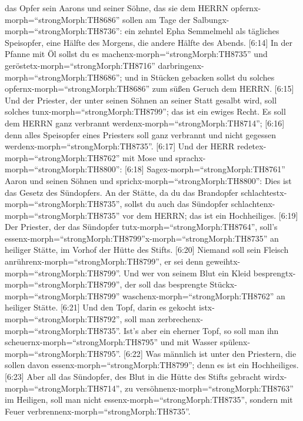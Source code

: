 das Opfer sein Aarons und seiner Söhne, das sie dem HERRN
opfernx-morph=``strongMorph:TH8686'' sollen am Tage der
Salbungx-morph=``strongMorph:TH8736'': ein zehntel Epha Semmelmehl als
tägliches Speisopfer, eine Hälfte des Morgens, die andere Hälfte des
Abends.  {[}6:14{]} In der Pfanne mit Öl sollst du es
machenx-morph=``strongMorph:TH8735'' und
geröstetx-morph=``strongMorph:TH8716''
darbringenx-morph=``strongMorph:TH8686''; und in Stücken gebacken sollst
du solches opfernx-morph=``strongMorph:TH8686'' zum süßen Geruch dem
HERRN.  {[}6:15{]} Und der Priester, der unter seinen
Söhnen an seiner Statt gesalbt wird, soll solches
tunx-morph=``strongMorph:TH8799''; das ist ein ewiges Recht. Es soll dem
HERRN ganz verbrannt werdenx-morph=``strongMorph:TH8714''; 
{[}6:16{]} denn alles Speisopfer eines Priesters soll ganz verbrannt und
nicht gegessen werdenx-morph=``strongMorph:TH8735''. 
{[}6:17{]} Und der HERR redetex-morph=``strongMorph:TH8762'' mit Mose
und sprachx-morph=``strongMorph:TH8800'':  {[}6:18{]}
Sagex-morph=``strongMorph:TH8761'' Aaron und seinen Söhnen und
sprichx-morph=``strongMorph:TH8800'': Dies ist das Gesetz des
Sündopfers. An der Stätte, da du das Brandopfer
schlachtestx-morph=``strongMorph:TH8735'', sollst du auch das Sündopfer
schlachtenx-morph=``strongMorph:TH8735'' vor dem HERRN; das ist ein
Hochheiliges.  {[}6:19{]} Der Priester, der das Sündopfer
tutx-morph=``strongMorph:TH8764'', soll's
essenx-morph=``strongMorph:TH8799''x-morph=``strongMorph:TH8735'' an
heiliger Stätte, im Vorhof der Hütte des Stifts. 
{[}6:20{]} Niemand soll sein Fleisch
anrührenx-morph=``strongMorph:TH8799'', er sei denn
geweihtx-morph=``strongMorph:TH8799''. Und wer von seinem Blut ein Kleid
besprengtx-morph=``strongMorph:TH8799'', der soll das besprengte
Stückx-morph=``strongMorph:TH8799''
waschenx-morph=``strongMorph:TH8762'' an heiliger Stätte. 
{[}6:21{]} Und den Topf, darin es gekocht
istx-morph=``strongMorph:TH8792'', soll man
zerbrechenx-morph=``strongMorph:TH8735''. Ist's aber ein eherner Topf,
so soll man ihn scheuernx-morph=``strongMorph:TH8795'' und mit Wasser
spülenx-morph=``strongMorph:TH8795''.  {[}6:22{]} Was
männlich ist unter den Priestern, die sollen davon
essenx-morph=``strongMorph:TH8799''; denn es ist ein Hochheiliges.
 {[}6:23{]} Aber all das Sündopfer, des Blut in die Hütte
des Stifts gebracht wirdx-morph=``strongMorph:TH8714'', zu
versöhnenx-morph=``strongMorph:TH8763'' im Heiligen, soll man nicht
essenx-morph=``strongMorph:TH8735'', sondern mit Feuer
verbrennenx-morph=``strongMorph:TH8735''.

